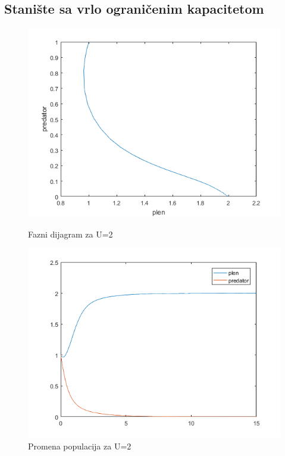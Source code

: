 \documentclass[a4paper]{article}
\begin{document}
\subsection{Stanište sa vrlo ograničenim kapacitetom}
\label{sub:log_mod_ogr}

\begin{figure}[H]
    \centering
    \begin{minipage}{0.45\textwidth}
        \centering
        \includegraphics[width=1\textwidth]{images/lv_low_u_phase} %
        \caption{Fazni dijagram za U=2}
    \end{minipage}\hfill
    \begin{minipage}{0.45\textwidth}
        \centering
        \includegraphics[width=1\textwidth]{images/lv_low_u_time} %
        \caption{Promena populacija za U=2}
    \end{minipage}
\end{figure}
\end{document}

